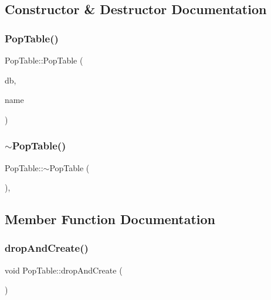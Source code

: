 \subsection{Constructor \& Destructor Documentation}
\mbox{\label{class_pop_table_a0c04f8809217579c77178579fdefd379}} 
\subsubsection{\texorpdfstring{PopTable()}{PopTable()}}
{\footnotesize\ttfamily Pop\+Table\+::\+Pop\+Table (\begin{DoxyParamCaption}\item[{std\+::shared\+\_\+ptr$<$ sqlite\+::\+S\+Q\+Lite\+Storage $>$}]{db,  }\item[{std\+::string}]{name }\end{DoxyParamCaption})}

\mbox{\label{class_pop_table_a37937514ef03f628721c224576114a23}} 
\subsubsection{\texorpdfstring{$\sim$PopTable()}{~PopTable()}}
{\footnotesize\ttfamily Pop\+Table\+::$\sim$\+Pop\+Table (\begin{DoxyParamCaption}{ }\end{DoxyParamCaption})\hspace{0.3cm}{\ttfamily [default]}, {\ttfamily [noexcept]}}



\subsection{Member Function Documentation}
\mbox{\label{class_pop_table_a10cb820d1c4db4b5f9ba4254f50de2ba}} 
\subsubsection{\texorpdfstring{dropAndCreate()}{dropAndCreate()}}
{\footnotesize\ttfamily void Pop\+Table\+::drop\+And\+Create (\begin{DoxyParamCaption}{ }\end{DoxyParamCaption})}

